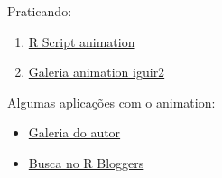 \begin{frame}

  Praticando:
  \begin{enumerate}
  \item \href{run:./R/animation/animation.R}{R Script animation}
  \item \href{run:./animation/animation.html}{Galeria animation iguir2}
  \end{enumerate}
  
  \vspace{0.5cm} Algumas aplicações com o animation:
  \begin{itemize}
  \item
    \href{http://vis.supstat.com/categories.html\#animation-ref}{Galeria
      do autor}
  \item \href{http://www.r-bloggers.com/?s=animation}{Busca no R
      Bloggers}
  \end{itemize}

\end{frame}
